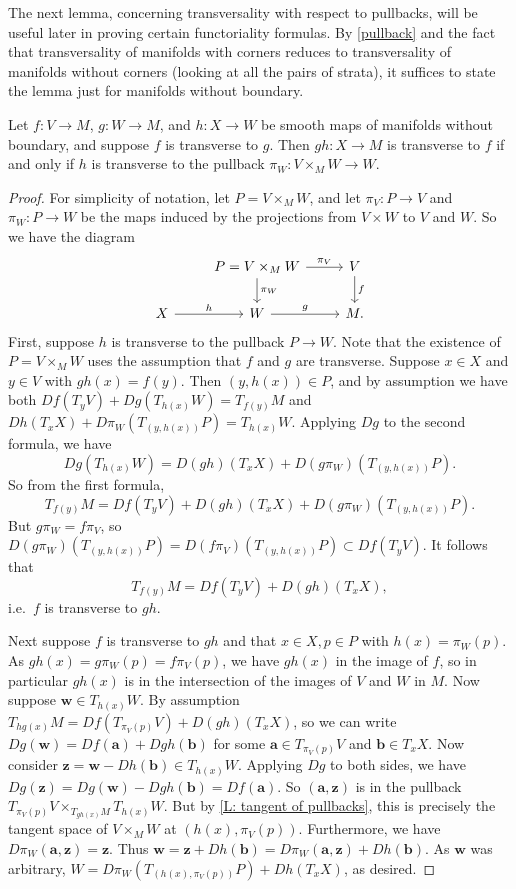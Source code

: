 The next lemma, concerning transversality with respect to pullbacks, will be useful later in proving certain functoriality formulas.
By \cref{pullback} and the fact that transversality of manifolds with corners reduces to transversality of manifolds without corners (looking at all the pairs of strata), it suffices to state the lemma just for manifolds without boundary.

\begin{lemma}\label{L: transverse to pullback}
	Let $f \colon V \to M$, $g \colon W \to M$, and $h \colon X \to W$ be smooth maps of manifolds without boundary, and suppose $f$ is transverse to $g$.
	Then $gh \colon X \to M$ is transverse to $f$ if and only if $h$ is transverse to the pullback $\pi_W \colon V \times_M W \to W$.
\end{lemma}

\begin{proof}
	For simplicity of notation, let $P = V \times_MW$, and let $\pi_V \colon P \to V$ and $\pi_W \colon P \to W$ be the maps induced by the projections from $V \times W$ to $V$ and $W$.
	So we have the diagram
	\[
	\begin{tikzcd}
		& P = V \times_M W \arrow[r, "\pi_V"] \arrow[d, "\pi_W"] & V \arrow[d, "f"] \\
		X \arrow[r, "h"] & W \arrow[r, "g"]& M.
	\end{tikzcd}
	\]
	First, suppose $h$ is transverse to the pullback $P \to W$.
	Note that the existence of $P = V \times_M W$ uses the assumption that $f$ and $g$ are transverse.
	Suppose $x \in X$ and $y \in V$ with $gh(x) = f(y)$.
	Then $(y,h(x)) \in P$, and by assumption we have both $Df(T_yV)+Dg(T_{h(x)}W) = T_{f(y)}M$ and
	$Dh(T_xX)+D\pi_W(T_{(y,h(x))}P) = T_{h(x)}W$.
	Applying $Dg$ to the second formula, we have
	$$Dg(T_{h(x)}W) = D(gh)(T_xX)+D(g\pi_W)(T_{(y,h(x))}P).$$
	So from the first formula,
	$$T_{f(y)}M = Df(T_yV)+D(gh)(T_xX)+D(g\pi_W)(T_{(y,h(x))}P).$$
	But $g\pi_W = f\pi_V$, so $D(g\pi_W)(T_{(y,h(x))}P) = D(f\pi_V)(T_{(y,h(x))}P) \subset Df(T_yV)$.
	It follows that
	$$T_{f(y)}M = Df(T_yV)+D(gh)(T_xX),$$
	i.e.\ $f$ is transverse to $gh$.

	Next suppose $f$ is transverse to $gh$ and that $x \in X, p \in P$ with $h(x) = \pi_W(p)$.
	As $gh(x) = g\pi_W(p) = f\pi_V(p)$, we have $gh(x)$ in the image of $f$, so in particular $gh(x)$ is in the intersection of the images of $V$ and $W$ in $M$.
	Now suppose $\mathbf w \in T_{h(x)}W$.
	By assumption $T_{hg(x)}M = Df(T_{\pi_V(p)}V)+D(gh)(T_xX)$, so we can write $Dg(\mathbf w) = Df(\mathbf a)+Dgh(\mathbf b)$ for some $\mathbf a \in T_{\pi_V(p)}V$ and $\mathbf b \in T_x X$.
	Now consider $\mathbf z = \mathbf w-Dh(\mathbf b) \in T_{h(x)}W$.
	Applying $Dg$ to both sides, we have $Dg(\mathbf z) = Dg(\mathbf w)-Dgh(\mathbf b) = Df(\mathbf a)$.
	So $(\mathbf a,\mathbf z)$ is in the pullback $T_{\pi_V(p)}V \times_{T_{gh(x)}M} T_{h(x)}W$.
	But by \cref{L: tangent of pullbacks}, this is precisely the tangent space of $V \times_MW$ at $(h(x),\pi_V(p))$.
	Furthermore, we have $D\pi_W(\mathbf a,\mathbf z) = \mathbf z$.
	Thus $\mathbf w = \mathbf z+Dh(\mathbf b) = D\pi_W(\mathbf a,\mathbf z)+Dh(\mathbf b)$.
	As $\mathbf w$ was arbitrary, $W = D\pi_W(T_{(h(x),\pi_V(p))}P)+Dh(T_xX)$, as desired.
\end{proof}

